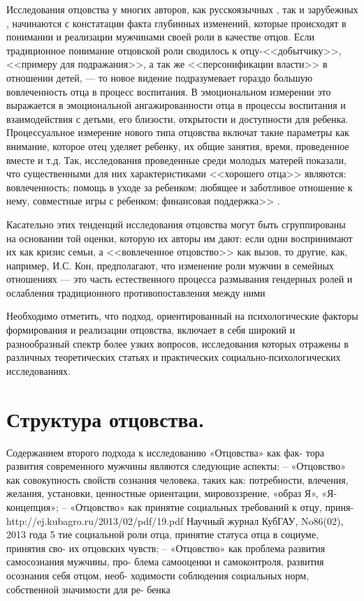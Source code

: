 \documentclass{../../common/thesisbyxetex}
\begin{document}
Исследования отцовства у многих авторов, как русскоязычных \cite{relot, psyot}, так и зарубежных
\cite{meta, morfat, legfat}, начинаются с констатации факта глубинных изменений, которые происходят
в понимании и реализации мужчинами своей роли в качестве отцов. Если традиционное понимание
отцовской роли сводилось к отцу-<<добытчику>>, <<примеру для подражания>>, а так же
<<персонификации власти>> в отношении детей, --- то новое видение подразумевает гораздо большую
вовлеченность отца в процесс воспитания. В эмоциональном измерении это выражается в  эмоциональной
ангажированности отца в процессы воспитания и взаимодействия с детьми, его близости, открытости и
доступности для ребенка. Процессуальное измерение нового типа отцовства включат такие параметры как
внимание, которое отец уделяет ребенку, их общие занятия, время, проведенное вместе и т.д.
Так, исследования проведенные среди молодых матерей показали, что существенными  для них
характеристиками <<хорошего отца>> являются: вовлеченность; помощь в уходе за ребенком; любящее и
заботливое отношение к нему, совместные игры с ребенком; финансовая поддержка>> \cite[137]{money}.

Касательно этих тенденций исследования отцовства могут быть сгруппированы на основании той оценки,
которую их авторы им дают: если одни воспринимают их как кризис семьи, а <<вовлеченное отцовство>>
как вызов, то другие, как, например, И.С. Кон, предполагают, что изменение роли мужчин в семейных
отношениях --- это часть естественного процесса размывания гендерных ролей и ослабления
традиционного противопоставления между ними \cite{konmen}

Необходимо отметить, что подход, ориентированный на психологические факторы формирования и
реализации отцовства, включает в себя широкий и разнообразный спектр более узких вопросов,
исследования которых отражены в различных теоретических статьях и практических
социально-психологических исследованиях.



\section{Структура отцовства.}


Содержанием второго подхода к исследованию «Отцовства» как фак-
тора развития современного мужчины являются следующие аспекты:
– «Отцовство» как совокупность свойств сознания человека, таких
как: потребности, влечения, желания, установки, ценностные ориентации,
мировоззрение, «образ Я», «Я-концепция»;
– «Отцовство» как принятие социальных требований к отцу, приня-
http://ej.kubagro.ru/2013/02/pdf/19.pdf
Научный журнал КубГАУ, No86(02), 2013 года
 5
тие социальной роли отца, принятие статуса отца в социуме, принятия сво-
их отцовских чувств;
– «Отцовство» как проблема развития самосознания мужчины, про-
блема самооценки и самоконтроля, развития осознания себя отцом, необ-
ходимости соблюдения социальных норм, собственной значимости для ре-
бенка \cite{psyot}
\end{document}
